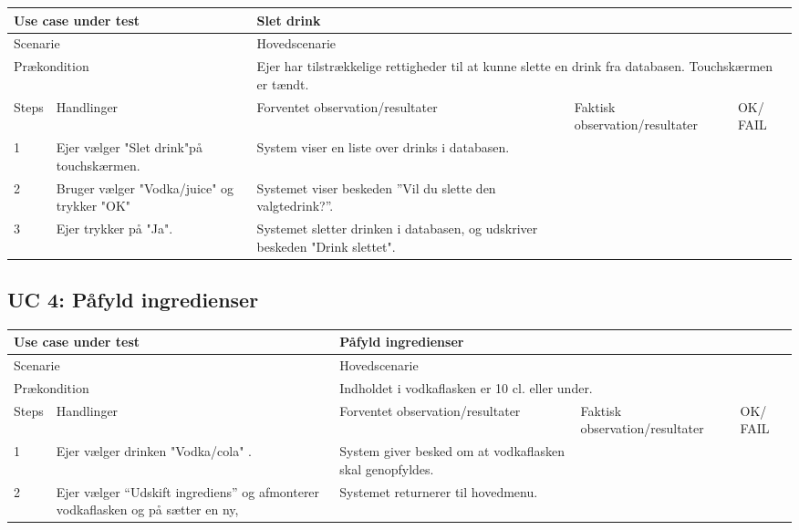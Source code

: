 \begin{table}[H]
\begin{tabular}{|p{1cm}|p{4cm}|p{4cm}|p{4cm}|p{1cm}|}
\hline
\multicolumn{2}{|p{5cm}|}{Use case under test} & \multicolumn{3}{p{9cm}|}{Slet drink}                                       \\ \hline
\multicolumn{2}{|p{5cm}|}{Scenarie}            & \multicolumn{3}{p{9cm}|}{Hovedscenarie}                                          \\ \hline
\multicolumn{2}{|p{5cm}|}{Prækondition}        & \multicolumn{3}{p{9cm}|}{Ejer har tilstrækkelige rettigheder til at kunne slette en drink fra databasen. Touchskærmen er tændt.}                                 \\ \hline
Steps               & Handlinger          & Forventet observation/resultater & Faktisk observation/resultater & OK/ FAIL \\ \hline
1    & Ejer vælger "Slet drink"på touchskærmen.  & System viser en liste over drinks i databasen. &   &         \\ \hline
2    & Bruger vælger "Vodka/juice" og trykker "OK"  & Systemet viser beskeden ”Vil du slette den valgtedrink?”.  &   &         \\ \hline
3    & Ejer trykker på "Ja".  & Systemet sletter drinken i databasen, og udskriver beskeden "Drink slettet".  &   &         \\ \hline

\end{tabular}
\end{table}

\subsection{UC 4: Påfyld ingredienser}

\begin{table}[H]
\begin{tabular}{|p{1cm}|p{4cm}|p{4cm}|p{4cm}|p{1cm}|}
\hline
\multicolumn{2}{|p{5cm}|}{Use case under test} & \multicolumn{3}{p{9cm}|}{Påfyld ingredienser}                                       \\ \hline
\multicolumn{2}{|p{5cm}|}{Scenarie}            & \multicolumn{3}{p{9cm}|}{Hovedscenarie}                                          \\ \hline
\multicolumn{2}{|p{5cm}|}{Prækondition}        & \multicolumn{3}{p{9cm}|}{Indholdet i vodkaflasken er 10 cl. eller under.}                                 \\ \hline
Steps               & Handlinger          & Forventet observation/resultater & Faktisk observation/resultater & OK/ FAIL \\ \hline
1    & Ejer vælger drinken "Vodka/cola" .  & System giver besked om at vodkaflasken skal genopfyldes.&   &         \\ \hline
2    & Ejer vælger “Udskift ingrediens” og afmonterer vodkaflasken og på sætter en ny,  & Systemet returnerer til hovedmenu.  &   &         \\ \hline

\end{tabular}
\end{table}


